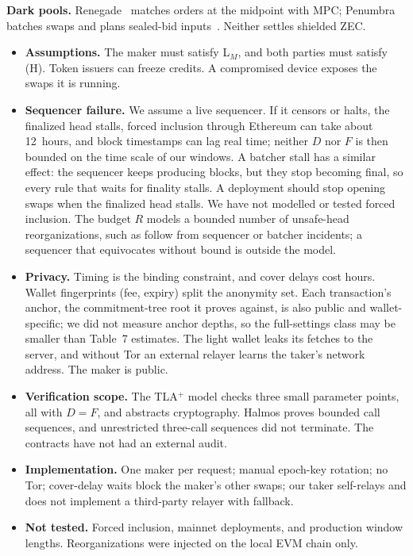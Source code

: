 \documentclass[10pt,letterpaper]{article}
\makeatletter
\renewcommand\section{\@startsection{section}{1}{\z@}{-1.3em}{0.45em}{\normalfont\large\bfseries}}
\theoremstyle{plain}
\theoremstyle{definition}
\makeatother
\begin{document}
\textbf{Dark pools.} Renegade~\cite{renegade} matches orders at the midpoint with MPC; Penumbra
batches swaps and plans sealed-bid inputs~\cite{penumbra}. Neither settles shielded ZEC.

\section{Limitations}

\begin{itemize}\setlength\itemsep{0.1em}
\item \textbf{Assumptions.} The maker must satisfy L$_M$, and both parties must satisfy (H). Token
issuers can freeze credits. A compromised device exposes the swaps it is running.
\item \textbf{Sequencer failure.} We assume a live sequencer. If it censors or halts, the
finalized head stalls, forced inclusion through Ethereum can take about 12~hours, and block
timestamps can lag real time; neither $D$ nor $F$ is then bounded on the time scale of our
windows. A batcher stall has a similar effect: the sequencer keeps producing blocks, but they stop
becoming final, so every rule that waits for finality stalls. A deployment should stop opening
swaps when the finalized head stalls. We have not modelled or tested forced inclusion. The budget
$R$ models a bounded number of unsafe-head reorganizations, such as follow from sequencer or
batcher incidents; a sequencer that equivocates without bound is outside the model.
\item \textbf{Privacy.} Timing is the binding constraint, and cover delays cost hours. Wallet
fingerprints (fee, expiry) split the anonymity set. Each transaction's anchor, the commitment-tree
root it proves against, is also public and wallet-specific; we did not measure anchor depths, so
the full-settings class may be smaller than Table~7 estimates. The light wallet leaks its fetches to the
server, and without Tor an external relayer learns the taker's network address. The maker is
public.
\item \textbf{Verification scope.} The TLA$^+$ model checks three small parameter points, all with $D = F$, and
abstracts cryptography. Halmos proves bounded call sequences, and unrestricted three-call
sequences did not terminate. The contracts have not had an external audit.
\item \textbf{Implementation.} One maker per request; manual epoch-key rotation; no Tor;
cover-delay waits block the maker's other swaps; our taker self-relays and does not implement a
third-party relayer with fallback.
\item \textbf{Not tested.} Forced inclusion, mainnet deployments, and production window lengths.
Reorganizations were injected on the local EVM chain only.
\end{itemize}
\end{document}
